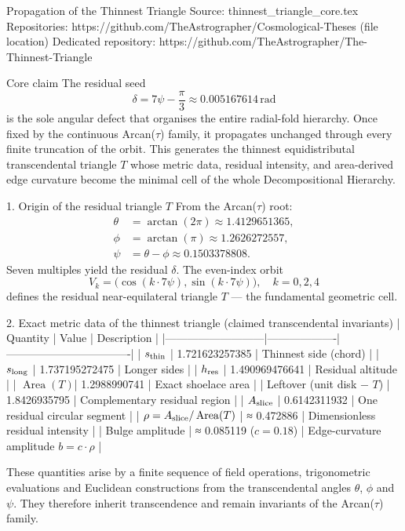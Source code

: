 Propagation of the Thinnest Triangle  
Source: thinnest_triangle_core.tex  
Repositories:  
https://github.com/TheAstrographer/Cosmological-Theses (file location)  
Dedicated repository: https://github.com/TheAstrographer/The-Thinnest-Triangle  

Core claim
The residual seed  
\[
\delta = 7\psi - \frac{\pi}{3} \approx 0.005167614\,\mathrm{rad}
\]  
is the sole angular defect that organises the entire radial-fold hierarchy. Once fixed by the continuous Arcan(\(\tau\)) family, it propagates unchanged through every finite truncation of the orbit. This generates the thinnest equidistributal transcendental triangle \(T\) whose metric data, residual intensity, and area-derived edge curvature become the minimal cell of the whole Decompositional Hierarchy.

1. Origin of the residual triangle \(T\)
From the Arcan(\(\tau\)) root:
\[
\begin{align*}
\theta &= \arctan(2\pi) \approx 1.4129651365,\\
\phi &= \arctan(\pi) \approx 1.2626272557,\\
\psi &= \theta - \phi \approx 0.1503378808.
\end{align*}
\]
Seven multiples yield the residual \(\delta\). The even-index orbit  
\[
V_k = \bigl(\cos(k\cdot 7\psi),\sin(k\cdot 7\psi)\bigr),\quad k=0,2,4
\]  
defines the residual near-equilateral triangle \(T\) — the fundamental geometric cell.

2. Exact metric data of the thinnest triangle (claimed transcendental invariants)
| Quantity                  | Value             | Description                      |
|---------------------------|-------------------|----------------------------------|
| \(s_{\rm thin}\)          | 1.721623257385   | Thinnest side (chord)            |
| \(s_{\rm long}\)          | 1.737195272475   | Longer sides                     |
| \(h_{\rm res}\)           | 1.490969476641   | Residual altitude                |
| \(\operatorname{Area}(T)\)| 1.2988990741     | Exact shoelace area              |
| Leftover (unit disk − \(T\)) | 1.8426935795  | Complementary residual region    |
| \(A_{\rm slice}\)         | 0.6142311932     | One residual circular segment    |
| \(\rho = A_{\rm slice}/\operatorname{Area}(T)\) | ≈ 0.472886 | Dimensionless residual intensity |
| Bulge amplitude           | ≈ 0.085119 (\(c=0.18\)) | Edge-curvature amplitude \(b = c\cdot\rho\) |

These quantities arise by a finite sequence of field operations, trigonometric evaluations and Euclidean constructions from the transcendental angles \(\theta\), \(\phi\) and \(\psi\). They therefore inherit transcendence and remain invariants of the Arcan(\(\tau\)) family.

